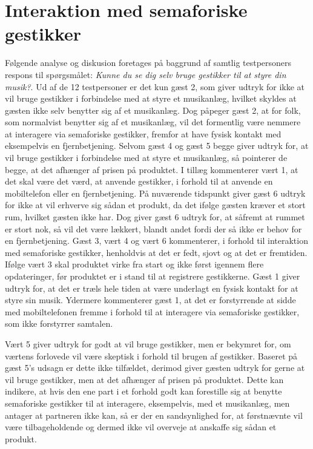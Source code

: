 \section{Interaktion med semaforiske gestikker}
\label{TestresultaterSocialAcceptBrug}
%
Følgende analyse og diskusion foretages på baggrund af samtlig testpersoners respons til spørgsmålet: \textit{Kunne du se dig selv bruge gestikker til at styre din musik?}. \blankline
%
Ud af de 12 testpersoner er det kun gæst 2, som giver udtryk for ikke at vil bruge gestikker i forbindelse med at styre et musikanlæg, hvilket skyldes at gæsten ikke selv benytter sig af et musikanlæg. Dog påpeger gæst 2, at for folk, som normalvist benytter sig af et musikanlæg, vil det formentlig være nemmere at interagere via semaforiske gestikker, fremfor at have fysisk kontakt med eksempelvis en fjernbetjening. Selvom gæst 4 og gæst 5 begge giver udtryk for, at vil bruge gestikker i forbindelse med at styre et musikanlæg, så pointerer de begge, at det afhænger af prisen på produktet. I tillæg kommenterer vært 1, at det skal være det værd, at anvende gestikker, i forhold til at anvende en mobiltelefon eller en fjernbetjening. På nuværende tidspunkt giver gæst 6 udtryk for ikke at vil erhverve sig sådan et produkt, da det ifølge gæsten kræver et stort rum, hvilket gæsten ikke har. Dog giver gæst 6 udtryk for, at såfremt at rummet er stort nok, så vil det være lækkert, blandt andet fordi der så ikke er behov for en fjernbetjening. Gæst 3, vært 4 og vært 6 kommenterer, i forhold til interaktion med semaforiske gestikker, henholdvis at det er fedt, sjovt og at det er fremtiden. Ifølge vært 3 skal produktet virke fra start og ikke først igennem flere opdateringer, før produktet er i stand til at registrere gestikkerne. Gæst 1 giver udtryk for, at det er træls hele tiden at være underlagt en fysisk kontakt for at styre sin musik. Ydermere kommenterer gæst 1, at det er forstyrrende at sidde med mobiltelefonen fremme i forhold til at interagere via semaforiske gestikker, som ikke forstyrrer samtalen.

Vært 5 giver udtryk for godt at vil bruge gestikker, men er bekymret for, om værtens forlovede vil være skeptisk i forhold til brugen af gestikker. Baseret på gæst 5's udsagn er dette ikke tilfældet, derimod giver gæsten udtryk for gerne at vil bruge gestikker, men at det afhænger af prisen på produktet. Dette kan indikere, at hvis den ene part i et forhold godt kan forestille sig at benytte semaforiske gestikker til at interagere, eksempelvis, med et musikanlæg, men antager at partneren ikke kan, så er der en sandsynlighed for, at førstnævnte vil være tilbageholdende og dermed ikke vil overveje at anskaffe sig sådan et produkt.    

